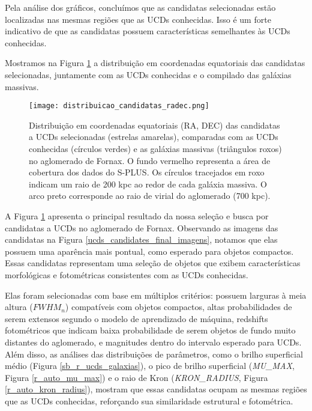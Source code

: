 Pela análise dos gráficos, concluímos que as candidatas selecionadas estão localizadas nas mesmas regiões que as UCDs conhecidas. Isso é um forte indicativo de que as candidatas possuem características semelhantes às UCDs conhecidas.

Mostramos na Figura \ref{distribuicao_candidatas_radec} a distribuição em coordenadas equatoriais das candidatas selecionadas, juntamente com as UCDs conhecidas e o compilado das galáxias massivas.

\begin{figure}[!ht]
    \begin{center}
    \texttt{[image: distribuicao\_candidatas\_radec.png]}
    \caption[]{Distribuição em coordenadas equatoriais (RA, DEC) das candidatas a UCDs selecionadas (estrelas amarelas), comparadas com as UCDs conhecidas (círculos verdes) e as galáxias massivas (triângulos roxos) no aglomerado de Fornax. O fundo vermelho representa a área de cobertura dos dados do S-PLUS. Os círculos tracejados em roxo indicam um raio de 200 kpc ao redor de cada galáxia massiva. O arco preto corresponde ao raio de virial do aglomerado (700 kpc).}
    \label{distribuicao_candidatas_radec}
    \end{center}
\end{figure}

A Figura \ref{distribuicao_candidatas_radec} apresenta o principal resultado da nossa seleção e busca por candidatas a UCDs no aglomerado de Fornax. Observando as imagens das candidatas na Figura \ref{ucds_candidates_final_imagens}, notamos que elas possuem uma aparência mais pontual, como esperado para objetos compactos. Essas candidatas representam uma seleção de objetos que exibem características morfológicas e fotométricas consistentes com as UCDs conhecidas.

Elas foram selecionadas com base em múltiplos critérios: possuem larguras à meia altura ($\textit{FWHM}_n$) compatíveis com objetos compactos, altas probabilidades de serem extensos segundo o modelo de aprendizado de máquina, redshifts fotométricos que indicam baixa probabilidade de serem objetos de fundo muito distantes do aglomerado, e magnitudes dentro do intervalo esperado para UCDs. Além disso, as análises das distribuições de parâmetros, como o brilho superficial médio (Figura \ref{sb_r_ucds_galaxias}), o pico de brilho superficial (\textit{MU\_MAX}, Figura \ref{r_auto_mu_max}) e o raio de Kron (\textit{KRON\_RADIUS}, Figura \ref{r_auto_kron_radius}), mostram que essas candidatas ocupam as mesmas regiões que as UCDs conhecidas, reforçando sua similaridade estrutural e fotométrica.

